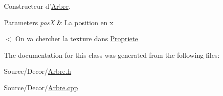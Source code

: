Constructeur d'\hyperlink{classArbre}{Arbre}. 


\begin{DoxyParams}{Parameters}
{\em pos\-X} & La position en x \\
\hline
\end{DoxyParams}
$<$ On va chercher la texture dans \hyperlink{namespacePropriete}{Propriete} 

The documentation for this class was generated from the following files\-:\begin{DoxyCompactItemize}
\item 
Source/\-Decor/\hyperlink{Arbre_8h}{Arbre.\-h}\item 
Source/\-Decor/\hyperlink{Arbre_8cpp}{Arbre.\-cpp}\end{DoxyCompactItemize}
